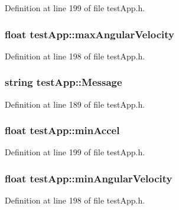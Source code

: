 Definition at line 199 of file test\-App.\-h.

\hypertarget{classtest_app_ab9565e8e6dc748ef68e6845f5f94cae9}{
\subsubsection[{max\-Angular\-Velocity}]{\setlength{\rightskip}{0pt plus 5cm}float test\-App\-::max\-Angular\-Velocity}}\label{classtest_app_ab9565e8e6dc748ef68e6845f5f94cae9}


Definition at line 198 of file test\-App.\-h.

\hypertarget{classtest_app_a0124035d0454fb6bd9152f8a87c40677}{
\subsubsection[{Message}]{\setlength{\rightskip}{0pt plus 5cm}string test\-App\-::\-Message}}\label{classtest_app_a0124035d0454fb6bd9152f8a87c40677}


Definition at line 189 of file test\-App.\-h.

\hypertarget{classtest_app_ab007edbc20b09d607f8010e2dbafdb97}{
\subsubsection[{min\-Accel}]{\setlength{\rightskip}{0pt plus 5cm}float test\-App\-::min\-Accel}}\label{classtest_app_ab007edbc20b09d607f8010e2dbafdb97}


Definition at line 199 of file test\-App.\-h.

\hypertarget{classtest_app_ac559756a01e0b98378bc29dfba9fac79}{
\subsubsection[{min\-Angular\-Velocity}]{\setlength{\rightskip}{0pt plus 5cm}float test\-App\-::min\-Angular\-Velocity}}\label{classtest_app_ac559756a01e0b98378bc29dfba9fac79}


Definition at line 198 of file test\-App.\-h.

